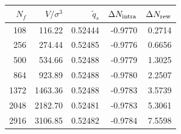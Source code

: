 \begin{tabular}{rrrrr}
\toprule
$N_f$ & $V/\sigma^3$ & $\widetilde q_s$ & $\Delta N_{\rm intra}$ & $\Delta N_{\rm rew}$ \\
\midrule
108 & 116.22 & 0.52444 & -0.9770 & 0.2714 \\
256 & 274.44 & 0.52485 & -0.9776 & 0.6656 \\
500 & 534.66 & 0.52488 & -0.9779 & 1.3025 \\
864 & 923.89 & 0.52488 & -0.9780 & 2.2507 \\
1372 & 1463.36 & 0.52488 & -0.9783 & 3.5739 \\
2048 & 2182.70 & 0.52481 & -0.9783 & 5.3061 \\
2916 & 3106.85 & 0.52482 & -0.9784 & 7.5598 \\
\bottomrule
\end{tabular}
